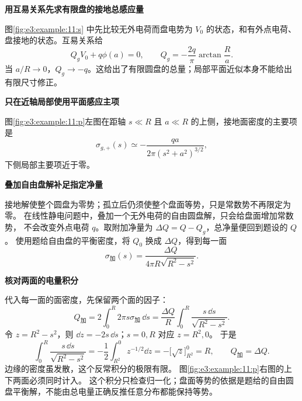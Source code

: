 \begin{solution}\textbf{用互易关系先求有限盘的接地总感应量}\par\nobreak
图\ref{fig:e3:example:11:s} 中先比较无外电荷而盘电势为 $V_0$ 的状态，和有外点电荷、盘接地的状态。互易关系给
\[
 Q_gV_0+q\phi(a)=0,\qquad
 Q_g=-\frac{2q}{\pi}\arctan\frac Ra.
\]
当 $a/R\to0$，$Q_g\to-q$。这给出了有限圆盘的总量；局部平面近似本身不能给出有限尺寸修正。



\par\medskip{}\noindent\textbf{只在近轴局部使用平面感应主项}\par\nobreak
图\ref{fig:e3:example:11:p}左图在距轴 $s\ll R$ 且 $a\ll R$ 的上侧，接地面密度的主要项是
\[
 \sigma_{g,+}(s)\simeq-\frac{qa}{2\pi(s^2+a^2)^{3/2}},
\]
下侧局部主要项近于零。

\par\medskip{}\noindent\textbf{叠加自由盘解补足指定净量}\par\nobreak
接地解使整个圆盘为零势；孤立后仍须使整个盘面等势，只是常数势不再限定为零。
在线性静电问题中，叠加一个无外电荷的自由圆盘解，只会给盘面增加常数势，
不会改变外点电荷 $q$。取附加净量为 $\Delta Q=Q-Q_g$，总净量便回到题设的 $Q$。
使用题给自由盘的平衡密度，将 $Q_0$ 换成 $\Delta Q$，得到每一面
\[
 \sigma_{\text{加}}(s)=\frac{\Delta Q}{4\pi R\sqrt{R^2-s^2}}.
\]


\par\medskip{}\noindent\textbf{核对两面的电量积分}\par\nobreak
代入每一面的面密度，先保留两个面的因子：
\[
 Q_{\text{加}}=2\int_0^R2\pi s\sigma_{\text{加}}\,\dd s
 =\frac{\Delta Q}{R}\int_0^R\frac{s\,\dd s}{\sqrt{R^2-s^2}}.
\]
令 $z=R^2-s^2$，则 $\dd z=-2s\,\dd s$；$s=0,R$ 对应 $z=R^2,0$。
于是
\[
 \int_0^R\frac{s\,\dd s}{\sqrt{R^2-s^2}}
 =-\frac12\int_{R^2}^{0}z^{-1/2}\dd z
 =-\bigl[\sqrt z\bigr]_{R^2}^{0}=R,
 \qquad Q_{\text{加}}=\Delta Q.
\]
边缘的密度虽发散，这个反常积分的极限有限。
图\ref{fig:e3:example:11:p}右图的上下两面必须同时计入。
这个积分只检查归一化；盘面等势的依据是题给的自由圆盘平衡解，不能由总电量正确反推任意分布都能保持等势。



\end{solution}
